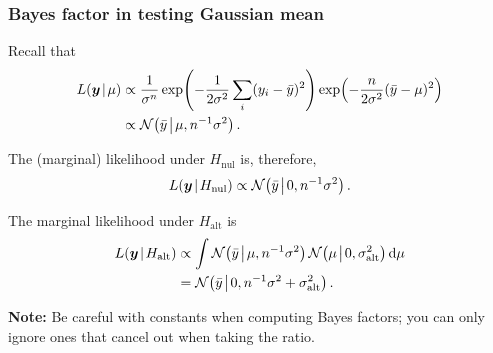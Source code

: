 \documentclass[18pt]{beamer}
\newcommand{\defineTightSpacing}{%
	\setlength{\abovedisplayskip}{.25\baselineskip}%
	\setlength{\belowdisplayskip}{.25\baselineskip}%
}
\newcommand{\given}{\mskip.7\thinmuskip | \mskip.7\thinmuskip}
\newcommand{\midGiven}{\mskip.7\thinmuskip \middle| \mskip.7\thinmuskip}
\newcommand{\diff}{\operatorname{\mathrm{d}}\!{}}
\newcommand{\normalDist}{\operatorname{\mathcal{N}}}
\newcommand{\likelihood}{L}
\newcommand{\by}{\bm{y}}
\newcommand{\hypothesis}{H}
\newcommand{\nullSub}{\mathrm{nul}}
\newcommand{\altSub}{\mathrm{alt}}
\begin{document}
\begin{frame}
\frametitle{Bayes factor in testing Gaussian mean}
Recall that
\begin{equation*} \defineTightSpacing%
\begin{aligned}
\likelihood(\by \given \mu)
	&\propto \frac{1}{\sigma^n}
		\exp\!\left( - \frac{1}{2 \sigma^2} \sum_i (y_i - \bar{y})^2 \right)
		\exp\!\left( - \frac{n}{2 \sigma^2} (\bar{y} - \mu)^2 \right) \\
	&\propto \normalDist\!\left(
		\bar{y} \midGiven \mu, n^{-1} \sigma^2
	\right).
\end{aligned}
\end{equation*}

\pause
\smallskip
The (marginal) likelihood under $\hypothesis_\nullSub$ is, therefore, 
\begin{equation*} \defineTightSpacing%
\likelihood(\by \given \hypothesis_\nullSub)
	\propto \normalDist\!\left(
		\bar{y} \midGiven 0, n^{-1} \sigma^2
	\right).
\end{equation*}

\pause
The marginal likelihood under $\hypothesis_\altSub$ is 
\begin{equation*} \defineTightSpacing%
\begin{aligned}
\likelihood(\by \given \hypothesis_\altSub)
	&\propto \int \normalDist\!\left(
		\bar{y} \midGiven \mu, n^{-1} \sigma^2
	\right)
	\normalDist\!\left(
		\mu \midGiven 0, \sigma_\altSub^2
	\right) \diff \mu \\
	&= \normalDist\!\left(
		\bar{y} \midGiven 0, n^{-1} \sigma^2 + \sigma_\altSub^2
	\right).
\end{aligned}
\end{equation*}

\pause
\textbf{Note:} Be careful with constants when computing Bayes factors; 
you can only ignore ones that cancel out when taking the ratio. %
\end{frame}
\end{document}
